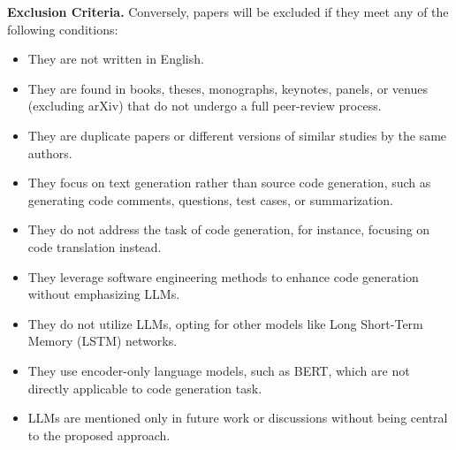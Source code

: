\textbf{Exclusion Criteria.} 
Conversely, papers will be excluded if they meet any of the following conditions:
\begin{itemize}
    \item They are not written in English.
    \item They are found in books, theses, monographs, keynotes, panels, or venues (excluding arXiv) that do not undergo a full peer-review process.
    \item They are duplicate papers or different versions of similar studies by the same authors.
    \item They focus on text generation rather than source code generation, such as generating code comments, questions, test cases, or summarization.
    \item They do not address the task of code generation, for instance, focusing on code translation instead.
    \item They leverage software engineering methods to enhance code generation without emphasizing LLMs.
    \item They do not utilize LLMs, opting for other models like Long Short-Term Memory (LSTM) networks.
    \item They use encoder-only language models, such as BERT, which are not directly applicable to code generation task.
    \item LLMs are mentioned only in future work or discussions without being central to the proposed approach.
\end{itemize}


